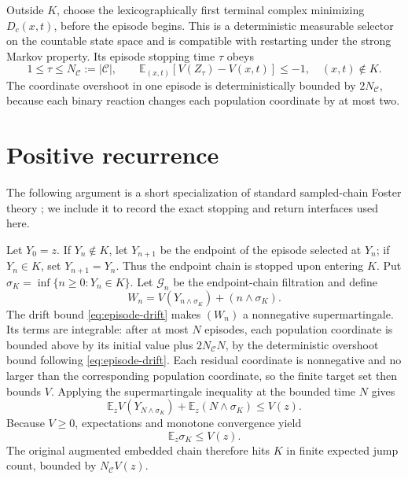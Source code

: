 Outside \(K\), choose the lexicographically first terminal complex minimizing
\(D_c(x,t)\), before the episode begins.  This is a deterministic measurable
selector on the countable state space and is compatible with restarting
under the strong Markov property.  Its episode stopping time \(\tau\) obeys
\begin{equation}\label{eq:episode-drift}
  1\le\tau\le N_{\mathcal C}:=|\mathcal C|,
  \qquad
  \mathbb E_{(x,t)}[V(Z_\tau)-V(x,t)]\le-1,
  \quad (x,t)\notin K.
\end{equation}
The coordinate overshoot in one episode is deterministically bounded by
\(2N_{\mathcal C}\), because each binary reaction changes each population coordinate by
at most two.

\section{Positive recurrence}\label{sec:recurrence}

The following argument is a short specialization of standard sampled-chain
Foster theory \citep{MeynTweedie2009}; we include it to record the exact
stopping and return interfaces used here.

Let \(Y_0=z\).  If \(Y_n\notin K\), let \(Y_{n+1}\) be the endpoint of the
episode selected at \(Y_n\); if \(Y_n\in K\), set \(Y_{n+1}=Y_n\).  Thus the
endpoint chain is stopped upon entering \(K\).  Put
\(
 \sigma_K=\inf\{n\ge0:Y_n\in K\}.
\)
Let \(\mathcal G_n\) be the endpoint-chain filtration and define
\[
 W_n=V(Y_{n\wedge\sigma_K})+(n\wedge\sigma_K).
\]
The drift bound \eqref{eq:episode-drift} makes \((W_n)\) a nonnegative
supermartingale.  Its terms are integrable: after at most \(N\) episodes, each
population coordinate is bounded above by its initial value plus
\(2N_{\mathcal C}N\), by the deterministic overshoot bound following
\eqref{eq:episode-drift}.  Each residual coordinate is nonnegative and no
larger than the corresponding population coordinate, so the finite target set
then bounds \(V\).  Applying the supermartingale inequality
at the bounded time \(N\) gives
\begin{equation}\label{eq:stopped-drift}
  \mathbb E_zV(Y_{N\wedge\sigma_K})
  +\mathbb E_z(N\wedge\sigma_K)
  \le V(z).
\end{equation}
Because \(V\ge0\), expectations and monotone convergence yield
\begin{equation}\label{eq:episodes-to-K}
  \mathbb E_z\sigma_K\le V(z).
\end{equation}
The original augmented embedded chain therefore hits \(K\) in finite
expected jump count, bounded by \(N_{\mathcal C} V(z)\).

